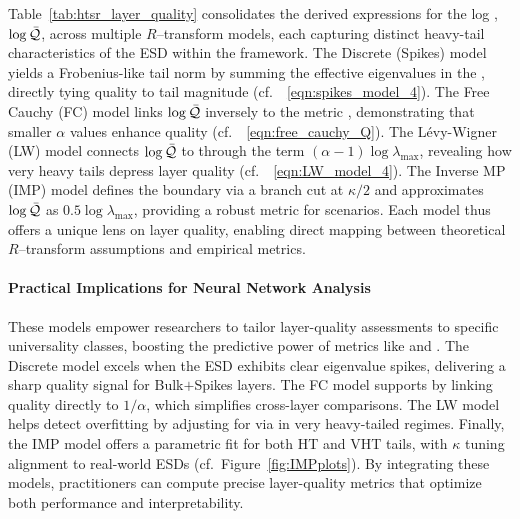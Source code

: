 
Table~\ref{tab:htsr_layer_quality} consolidates the derived expressions for the log \LayerQuality, \(\log\bar{\mathcal{Q}}\), across multiple \(R\)–transform models, each capturing distinct heavy-tail characteristics of the ESD within the \SETOL framework. The Discrete (Spikes) model yields a Frobenius-like tail norm by summing the effective eigenvalues in the \ECS, directly tying quality to tail magnitude (cf.\ \EQN~\ref{eqn:spikes_model_4}). The Free Cauchy (FC) model links \(\log\bar{\mathcal{Q}}\) inversely to the \HTSR metric \ALPHA, demonstrating that smaller \(\alpha\) values enhance quality (cf.\ \EQN~\ref{eqn:free_cauchy_Q}). The L\'evy-Wigner (LW) model connects \(\log\bar{\mathcal{Q}}\) to \ALPHAHAT through the term \((\alpha-1)\log\lambda_{\max}\), revealing how very heavy tails depress layer quality (cf.\ \EQN~\ref{eqn:LW_model_4}). The Inverse MP (IMP) model defines the \ECS boundary via a branch cut at \(\kappa/2\) and approximates \(\log\bar{\mathcal{Q}}\) as \(0.5\log\lambda_{\max}\), providing a robust metric for \IdealLearning scenarios. Each model thus offers a unique lens on layer quality, enabling direct mapping between theoretical \(R\)–transform assumptions and empirical \WW metrics.

\paragraph{Practical Implications for Neural Network Analysis}
These models empower researchers to tailor layer-quality assessments to specific \HTSR universality classes, boosting the predictive power of \WW metrics like \ALPHA and \ALPHAHAT. The Discrete model excels when the ESD exhibits clear eigenvalue spikes, delivering a sharp quality signal for Bulk$+$Spikes layers. The FC model supports \IdealLearning by linking quality directly to \(1/\alpha\), which simplifies cross-layer comparisons. The LW model helps detect overfitting by adjusting for \CorrelationTraps via \ALPHAHAT in very heavy-tailed regimes. Finally, the IMP model offers a parametric fit for both HT and VHT tails, with \(\kappa\) tuning alignment to real-world ESDs (cf.\ Figure~\ref{fig:IMPplots}). By integrating these models, practitioners can compute precise layer-quality metrics that optimize both performance and interpretability.
